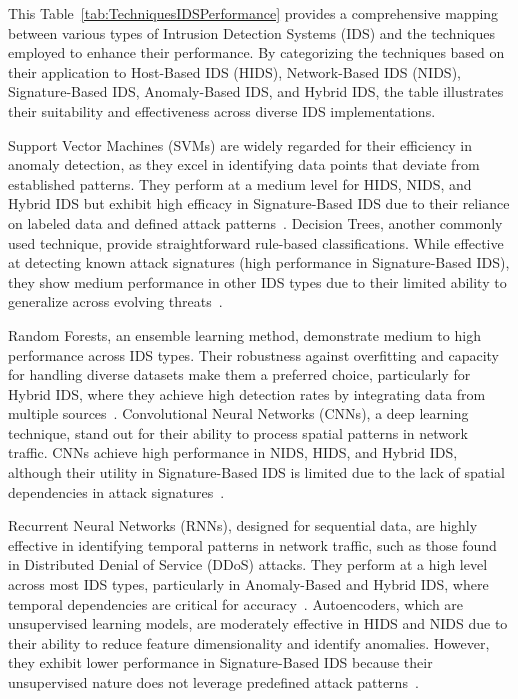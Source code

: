 This Table~\ref{tab:TechniquesIDSPerformance} provides a comprehensive mapping between various types of Intrusion Detection Systems (IDS) and the techniques employed to enhance their performance. By categorizing the techniques based on their application to Host-Based IDS (HIDS), Network-Based IDS (NIDS), Signature-Based IDS, Anomaly-Based IDS, and Hybrid IDS, the table illustrates their suitability and effectiveness across diverse IDS implementations.

Support Vector Machines (SVMs) are widely regarded for their efficiency in anomaly detection, as they excel in identifying data points that deviate from established patterns. They perform at a medium level for HIDS, NIDS, and Hybrid IDS but exhibit high efficacy in Signature-Based IDS due to their reliance on labeled data and defined attack patterns~\cite{Mirlekar2022}. Decision Trees, another commonly used technique, provide straightforward rule-based classifications. While effective at detecting known attack signatures (high performance in Signature-Based IDS), they show medium performance in other IDS types due to their limited ability to generalize across evolving threats~\cite{Jayalaxmi2022}.

Random Forests, an ensemble learning method, demonstrate medium to high performance across IDS types. Their robustness against overfitting and capacity for handling diverse datasets make them a preferred choice, particularly for Hybrid IDS, where they achieve high detection rates by integrating data from multiple sources~\cite{Meena2021}. Convolutional Neural Networks (CNNs), a deep learning technique, stand out for their ability to process spatial patterns in network traffic. CNNs achieve high performance in NIDS, HIDS, and Hybrid IDS, although their utility in Signature-Based IDS is limited due to the lack of spatial dependencies in attack signatures~\cite{Ghadermazi2024}.

Recurrent Neural Networks (RNNs), designed for sequential data, are highly effective in identifying temporal patterns in network traffic, such as those found in Distributed Denial of Service (DDoS) attacks. They perform at a high level across most IDS types, particularly in Anomaly-Based and Hybrid IDS, where temporal dependencies are critical for accuracy~\cite{vinayakumar2019deep}. Autoencoders, which are unsupervised learning models, are moderately effective in HIDS and NIDS due to their ability to reduce feature dimensionality and identify anomalies. However, they exhibit lower performance in Signature-Based IDS because their unsupervised nature does not leverage predefined attack patterns~\cite{Roshan2024}.

